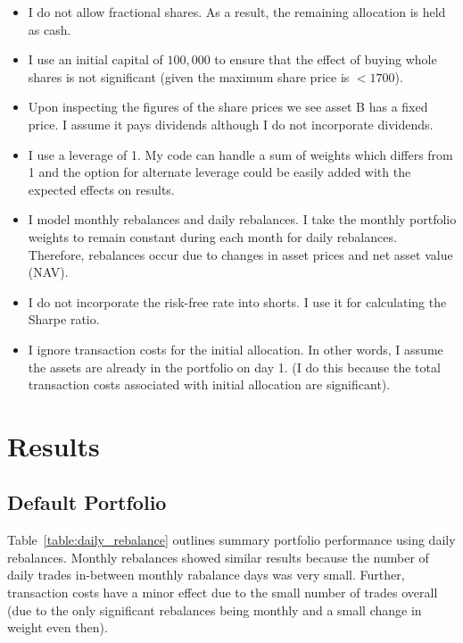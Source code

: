 \documentclass[12pt, oneside, a4paper]{article}
\begin{document}
\begin{itemize}
    \item I do not allow fractional shares. As a result, the remaining allocation is held as cash.

    \item I use an initial capital of $100,000$ to ensure that the effect of buying whole shares is not significant (given the maximum share price is $< 1700$).

    \item Upon inspecting the figures of the share prices we see asset B has a fixed price. I assume it pays dividends although I do not incorporate dividends.

    \item I use a leverage of 1. My code can handle a sum of weights which differs from 1 and the option for alternate leverage could be easily added with the expected effects on results.

    \item I model monthly rebalances and daily rebalances. I take the monthly portfolio weights to remain constant during each month for daily rebalances. Therefore, rebalances occur due to changes in asset prices and net asset value (NAV).

    \item I do not incorporate the risk-free rate into shorts. I use it for calculating the Sharpe ratio.

    \item I ignore transaction costs for the initial allocation. In other words, I assume the assets are already in the portfolio on day 1. (I do this because the total transaction costs associated with initial allocation are significant).


\end{itemize}


\section{Results}
\subsection{Default Portfolio}



Table~\ref{table:daily_rebalance} outlines summary portfolio performance using daily rebalances. Monthly rebalances showed similar results because the number of daily trades in-between monthly rabalance days was very small. Further, transaction costs have a minor effect due to the small number of trades overall (due to the only significant rebalances being monthly and a small change in weight even then).
\end{document}

